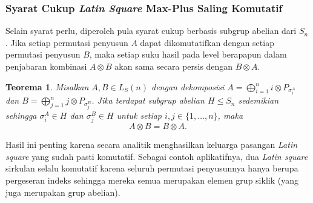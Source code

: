 \documentclass[journal]{IEEEtran}
\newtheorem{teo}[defn]{Teorema}
\theoremstyle{definition}
\theoremstyle{plain}
\begin{document}
\subsubsection{Syarat Cukup \textit{Latin Square} Max-Plus Saling Komutatif}
Selain syarat perlu, diperoleh pula syarat cukup berbasis subgrup abelian dari $S_n$. Jika setiap permutasi penyusun $A$ dapat dikomutatifkan dengan setiap permutasi penyusun $B$, maka setiap suku hasil pada level berapapun dalam penjabaran kombinasi $A \otimes B$ akan sama secara persis dengan $B \otimes A$.
\begin{teo}
    Misalkan $A,B\in L_S(n)$ dengan dekomposisi
    $A=\bigoplus_{i=1}^{n} i\otimes P_{\sigma_i^A}$ dan
    $B=\bigoplus_{j=1}^{n} j\otimes P_{\sigma_j^B}$.
    Jika terdapat subgrup abelian $H\leq S_n$ sedemikian sehingga
    $\sigma_i^A\in H$ dan $\sigma_j^B\in H$ untuk setiap $i,j\in\{1,\ldots,n\}$, maka
    \begin{equation}
        A\otimes B=B\otimes A.
    \end{equation}
\end{teo}
Hasil ini penting karena secara analitik menghasilkan keluarga pasangan \textit{Latin square} yang sudah pasti komutatif. Sebagai contoh aplikatifnya, dua \textit{Latin square} sirkulan selalu komutatif karena seluruh permutasi penyusunnya hanya berupa pergeseran indeks sehingga mereka semua merupakan elemen grup siklik (yang juga merupakan grup abelian).
\end{document}
